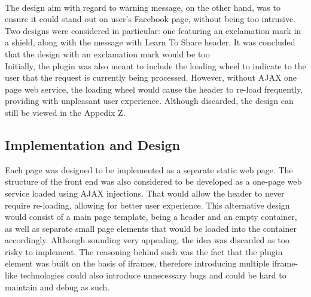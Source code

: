 \documentclass[a4paper,11pt]{article}
\begin{document}
\\
The design aim with regard to warning message, on the other hand, was to ensure it could stand out on user’s Facebook page, without being too intrusive. Two designs were considered in particular: one featuring an exclamation mark in a shield, along with the message with Learn To Share header. It was concluded that the design with an exclamation mark would be too
\\
Initially, the plugin was also meant to include the loading wheel to indicate to the user that the request is currently being processed. However, without AJAX one page web service, the loading wheel would cause the header to re-load frequently, providing with unpleasant user experience. Although discarded, the design can still be viewed in the Appedix Z.
\\

\subsection{Implementation and Design}

Each page was designed to be implemented as a separate static web page. The structure of the front end was also considered to be developed as a one-page web service loaded using AJAX injections. That would allow the header to never require re-loading, allowing for better user experience. This alternative design would consist of a main page template, being a header and an empty container, as well as separate small page elements that would be loaded into the container accordingly. Although sounding very appealing, the idea was discarded as too risky to implement. The reasoning behind such was the fact that the plugin element was built on the basis of iframes, therefore introducing multiple iframe-like technologies could also introduce unnecessary bugs and could be hard to maintain and debug as such.
\end{document}
